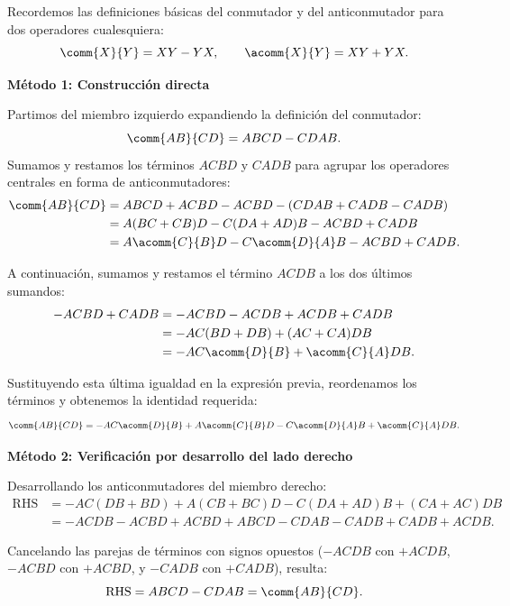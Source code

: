 \begin{resolucion}
Recordemos las definiciones básicas del conmutador y del anticonmutador para dos operadores cualesquiera:
\[
\comm{X}{Y} = XY - YX, \qquad \acomm{X}{Y} = XY + YX.
\]

\textbf{Método 1: Construcción directa}

Partimos del miembro izquierdo expandiendo la definición del conmutador:
\[
\comm{AB}{CD} = ABCD - CDAB.
\]
Sumamos y restamos los términos $ACBD$ y $CADB$ para agrupar los operadores centrales en forma de anticonmutadores:
\begin{align*}
\comm{AB}{CD} &= ABCD + ACBD - ACBD - (CDAB + CADB - CADB) \\
&= A(BC + CB)D - C(DA + AD)B - ACBD + CADB \\
&= A\acomm{C}{B}D - C\acomm{D}{A}B - ACBD + CADB.
\end{align*}

A continuación, sumamos y restamos el término $ACDB$ a los dos últimos sumandos:
\begin{align*}
-ACBD + CADB &= -ACBD - ACDB + ACDB + CADB \\
&= -AC(BD + DB) + (AC + CA)DB \\
&= -AC\acomm{D}{B} + \acomm{C}{A}DB.
\end{align*}

Sustituyendo esta última igualdad en la expresión previa, reordenamos los términos y obtenemos la identidad requerida:
\[
\comm{AB}{CD} = -AC \acomm{D}{B} + A \acomm{C}{B} D - C \acomm{D}{A} B + \acomm{C}{A} DB.
\]

\textbf{Método 2: Verificación por desarrollo del lado derecho}

Desarrollando los anticonmutadores del miembro derecho:
\begin{align*}
\text{RHS} &= -AC(DB + BD) + A(CB + BC)D - C(DA + AD)B + (CA + AC)DB \\
&= -ACDB - ACBD + ACBD + ABCD - CDAB - CADB + CADB + ACDB.
\end{align*}

Cancelando las parejas de términos con signos opuestos ($-ACDB$ con $+ACDB$, $-ACBD$ con $+ACBD$, y $-CADB$ con $+CADB$), resulta:
\[
\text{RHS} = ABCD - CDAB = \comm{AB}{CD}.
\]
\end{resolucion}

